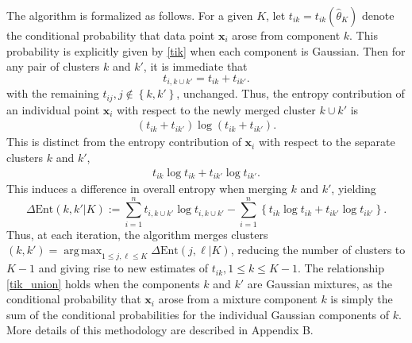 \documentclass{uwstat572}
\newcommand*\ba{\[ \begin{aligned}}
\newcommand*\ea{\end{aligned} \]}
\newcommand*\set[1]{\left\{#1\right\}}
\newcommand*\estim[1]{\widehat{#1}}
\newcommand*\bx{\mathbf{x}}
\DeclareMathOperator*{\argmax}{arg\;max}
\renewcommand\;{\,}
\begin{document}
The algorithm is formalized as follows.
For a given $K$, let $t_{ik} = t_{ik}\left(\estim\theta_K\right)$ denote the conditional probability that data point $\bx_i$ arose from component $k$.
This probability is explicitly given by \eqref{tik} when each component is Gaussian.
Then for any pair of clusters $k$ and $k'$, it is immediate that
\begin{equation}\label{tik_union}
t_{i, k\cup k'} = t_{ik} + t_{ik'}.
\end{equation}
with the remaining $t_{ij}, j \not\in \set{k, k'}$, unchanged.
Thus, the entropy contribution of an individual point $\bx_i$ with respect to the newly merged cluster $k \cup k'$ is
\ba
\left(t_{ik} + t_{ik'}\right) \log\left( t_{ik} + t_{ik'} \right).
\ea
This is distinct from the entropy contribution of $\bx_i$ with respect to the separate clusters $k$ and $k'$,
\ba
t_{ik} \log t_{ik} + t_{ik'} \log t_{ik'}.
\ea
This induces a difference in overall entropy when merging $k$ and $k'$, yielding
\begin{equation}\label{delta_ent}
\Delta\text{Ent}( k, k'|K) :=
\sum_{i=1}^n t_{i,k\cup k'} \log t_{i, k \cup k'}
- \sum_{i=1}^n \left\{ t_{ik} \log t_{ik} + t_{ik'} \log t_{ik'} \right\}.
\end{equation}
Thus, at each iteration, the algorithm merges clusters $(k, k') = \argmax_{1 \le j, \ell \le K} \Delta\text{Ent}(j, \ell|K)$, reducing the number of clusters to $K - 1$ and giving rise to new estimates of $t_{ik}, 1 \le k \le K - 1$.
The relationship \eqref{tik_union} holds when the components $k$ and $k'$ are Gaussian mixtures, as the conditional probability that $\bx_i$ arose from a mixture component $k$ is simply the sum of the conditional probabilities for the individual Gaussian components of $k$.
More details of this methodology are described in Appendix B.
\end{document}
